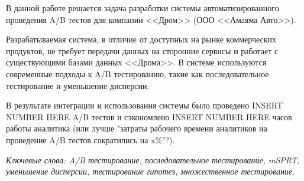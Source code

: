 \documentclass[../document.tex]{subfiles}
\begin{document}
	\par В данной работе решается задача разработки системы автоматизированного проведения A/B тестов для компании <<Дром>> (ООО <<Амаяма Авто>>).
	\par Разрабатываемая система, в отличие от доступных на рынке коммерческих продуктов, не требует передачи данных на сторонние сервисы и работает с существующими базами данных <<Дрома>>. В системе используются современные подходы к A/B тестированию, такие как последовательное тестирование и уменьшение дисперсии.
	\par В результате интеграции и использования системы было проведено INSERT NUMBER HERE A/B тестов и сэкономлено INSERT NUMBER HERE часов работы аналитика (или лучше "затраты рабочего времени аналитиков на проведение A/B тестов сократились на x\%"?).
	\par \textit{Ключевые слова: A/B тестирование, последовательное тестирование, mSPRT, уменьшение дисперсии, тестирование гипотез, множественное тестирование.}
\end{document}
